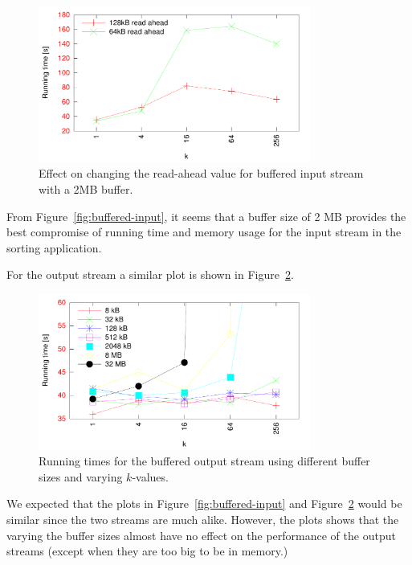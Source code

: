 \documentclass[a4paper,12pt]{article}
\begin{document}
\begin{figure}
  \centering
  \includegraphics[width=0.8\textwidth]{buffered_input_rd}
  \caption{Effect on changing the read-ahead value for buffered input
    stream with a 2MB buffer.}
  \label{fig:buffered-readahead}
\end{figure}

From Figure~\ref{fig:buffered-input}, it seems that a buffer size of 2
MB provides the best compromise of running time and memory usage for
the input stream in the sorting application.

For the output stream a similar plot is shown in
Figure~\ref{fig:buffered-output}.

\begin{figure}[h!]
  \centering
  \includegraphics[width=0.8\textwidth]{buffered_output}
  \caption{Running times for the buffered output stream using different
    buffer sizes and varying $k$-values.}
  \label{fig:buffered-output}
\end{figure}

We expected that the plots in Figure~\ref{fig:buffered-input} and
Figure~\ref{fig:buffered-output} would be similar since the two streams
are much alike. However, the plots shows that the varying the buffer sizes
almost have no effect on the performance of the output streams (except
when they are too big to be in memory.)
\end{document}
